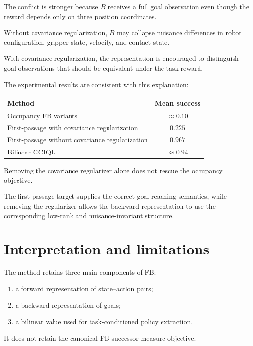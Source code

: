 \documentclass[11pt]{article}
\theoremstyle{remark}
\begin{document}
The conflict is stronger because $B$ receives a full goal observation even though the reward depends only on three position coordinates.

Without covariance regularization, $B$ may collapse nuisance differences in robot configuration, gripper state, velocity, and contact state.

With covariance regularization, the representation is encouraged to distinguish goal observations that should be equivalent under the task reward.

The experimental results are consistent with this explanation:

\begin{center}
\begin{tabular}{lc}
\toprule
Method & Mean success \\
\midrule
Occupancy FB variants & $\approx 0.10$ \\
First-passage with covariance regularization & $0.225$ \\
First-passage without covariance regularization & $0.967$ \\
Bilinear GCIQL & $\approx 0.94$ \\
\bottomrule
\end{tabular}
\end{center}

Removing the covariance regularizer alone does not rescue the occupancy objective.

The first-passage target supplies the correct goal-reaching semantics, while removing the regularizer allows the backward representation to use the corresponding low-rank and nuisance-invariant structure.

\section{Interpretation and limitations}

The method retains three main components of FB:

\begin{enumerate}[leftmargin=1.5em]
\item a forward representation of state--action pairs;
\item a backward representation of goals;
\item a bilinear value used for task-conditioned policy extraction.
\end{enumerate}

It does not retain the canonical FB successor-measure objective.
\end{document}
